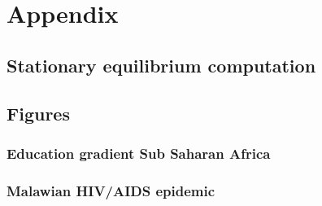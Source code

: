 \section{Appendix} \label{appendix}
%
%
\subsection{Stationary equilibrium computation}\label{stationary}

\newpage
\subsection{Figures}\label{figures}
%
\subsubsection{Education gradient Sub Saharan Africa}

\subsubsection{Malawian HIV/AIDS epidemic}


%
